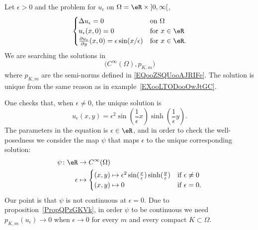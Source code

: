 \begin{example}
	Let \( \epsilon>0\) and the problem for \( u_{\epsilon}\) on \( \Omega=\eR\times \mathopen] 0 , \infty \mathclose[\),
	\begin{equation}        \label{EQooUBUEooMCDIlZ}
		\begin{cases}
			\Delta u_{\epsilon}=0                                                      & \text{on } \Omega    \\
			u_{\epsilon}(x,0)=0                                                        & \text{for } x\in \eR \\
			\frac{ \partial u_{\epsilon} }{ \partial y }(x,0)=\epsilon\sin(x/\epsilon) & \text{for }x\in \eR.
		\end{cases}
	\end{equation}
	We are searching the solutions in
	\begin{equation}
		\big(  C^{\infty}(\Omega),p_{K,m} \big)
	\end{equation}
	where \( p_{K,m}\) are the semi-norms defined in \eqref{EQooZSQUooAJRIFe}. The solution is unique from the same reason as in example~\ref{EXooLTODooOwJtGC}.

	One checks that, when \( \epsilon\neq 0\), the unique solution is
	\begin{equation}
		u_{\epsilon}(x,y)=\epsilon^2\sin(\frac{1}{ \epsilon }x)\sinh(\frac{1}{ \epsilon }y).
	\end{equation}
	The parameters in the equation is \( \epsilon\in \eR\), and in order to check the well-posedness we consider the map \( \psi\) that maps \( \epsilon\) to the unique corresponding solution:
	\begin{equation}
		\begin{aligned}
			\psi\colon \eR & \to  C^{\infty}(\Omega)                                                                                              \\
			\epsilon       & \mapsto \begin{cases}
				                         (x,y)\mapsto \epsilon^2\sin(\frac{ x }{ \epsilon })\sinh(\frac{ y }{ \epsilon }) & \text{if } \epsilon\neq 0 \\
				                         (x,y)\mapsto 0                                                                   & \text{if } \epsilon=0.
			                         \end{cases}
		\end{aligned}
	\end{equation}
	Our point is that \( \psi\) is not continuous at \( \epsilon=0\). Due to proposition~\ref{PropQPzGKVk}, in order \( \psi\) to be continuous we need \( p_{K,m}(u_{\epsilon})\to 0\) when \( \epsilon\to 0\) for every \( m\) and every compact \( K\subset \Omega\).


\end{example}
